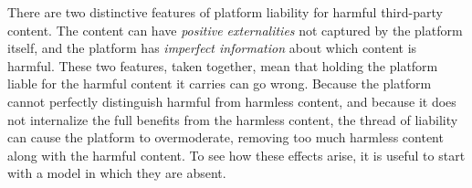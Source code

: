 \usetikzlibrary{arrows.meta, intersections, patterns}

\newenvironment{econ}[2]
{
  \begin{figure}[h]
      \centering
  \caption{#1}
  \label{#2}
  \begin{tikzpicture}[scale=1]
}
{
  \end{tikzpicture}
  \end{figure}
}

\newcommand{\drawaxes}[2] { 
    \draw[name path = xaxis, -|] (-0.2,0) -- (10,0) node[below]{}; 
    \draw[name path = yaxis, ->] (0,-0.2) -- (0,5.5) node[left]{} ;
}

\newcommand{\harmfunction}[1] {
    \draw[name path=harm, thick] (0,0) to (1,0) parabola (5,2.5) parabola[bend at end] (9,5) to (10,5) node[right]{#1};
}

\newcommand{\harmline}[1] {
    \draw[name path=harm, thick] (0,5) -- node[above]{#1} (10,5);
}

\newcommand{\revenueline}[1] {
    \draw[name path=revenue, thick] (0,1.5) to (10,1.5) node[right]{#1};
}

\newcommand{\dropline}[3]{
  \draw[dashed, thin] (#1, #2) -- (#1, 0) node[below]{#3};
}

\newcommand{\xe} {
    \draw[dashed, thin] (4.1,1.5) -- (4.1,0) node[below]{$x^e$}; 
}

\newcommand{\xexhat} {
    \draw[dashed, thin] (4.1,1.5) -- (4.1,0) node[below]{$\hat{x} = x^e$}; 
}


\newcommand{\xhat}[1]{
   \draw[dashed, thin] (#1,1.5) -- (#1,0) node[below]{$\hat{x}$}; 
}

\newcommand{\spilloverline}[1] {
    \draw[thick] (0,2.5) to (10,2.5) node[right]{#1};
}


There are two distinctive features of platform liability for harmful third-party content. The content can have \emph{positive externalities} not captured by the platform itself, and the platform has \emph{imperfect information} about which content is harmful. These two features, taken together, mean that holding the platform liable for the harmful content it carries can go wrong. Because the 
platform cannot perfectly distinguish harmful from harmless content, and because it does not internalize the full benefits from the harmless content, the thread of liability can cause the platform to overmoderate, removing too much harmless content along with the harmful content. To see how these effects arise, it is useful to start with a model in which they are absent.


